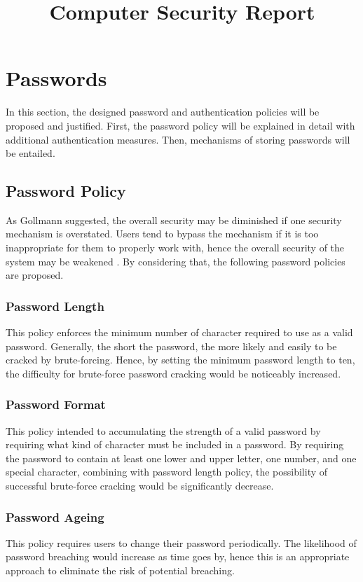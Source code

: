 \documentclass{article}
\title{Computer Security Report}
\begin{document}
%
\maketitle
%

\section{Passwords}
\label{sec:passwd}
In this section, the designed password and authentication policies will be proposed and justified.
First, the password policy will be explained in detail with additional authentication measures. 
Then, mechanisms of storing passwords will be entailed.

\subsection{Password Policy}
As Gollmann suggested, the overall security may be diminished 
if one security mechanism is overstated. Users tend to bypass the mechanism if it is too 
inappropriate for them to properly work with, hence the overall security of the system 
may be weakened \cite{GollmannDieter2011Cs/D}. By considering that, the following password policies are proposed.

\subsubsection{Password Length}
This policy enforces the minimum number of character required to use as a valid password. 
Generally, the short the password, the more likely and easily to be cracked by brute-forcing.
Hence, by setting the minimum password length to ten, the difficulty for brute-force password 
cracking would be noticeably increased.

\subsubsection{Password Format}
This policy intended to accumulating the strength of a valid password by requiring what kind 
of character must be included in a password. By requiring the password to contain 
at least one lower and upper letter, one number, and one special character, combining with 
password length policy, the possibility of successful brute-force cracking would 
be significantly decrease.

\subsubsection{Password Ageing}
This policy requires users to change their password periodically. The likelihood of password 
breaching would increase as time goes by, hence this is an appropriate approach to eliminate the 
risk of potential breaching.
\end{document}

